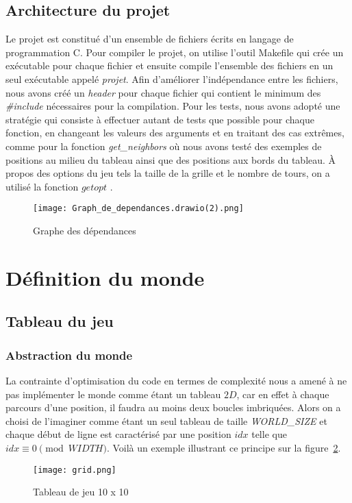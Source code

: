 \documentclass[11pt]{article}
\begin{document}
        \subsection{Architecture du projet}
            Le projet est constitué d'un ensemble de fichiers écrits en langage de programmation C. Pour compiler le projet, on utilise l'outil Makefile qui crée un exécutable pour chaque fichier et ensuite compile l'ensemble des fichiers en un seul exécutable appelé \textit{projet}. Afin d'améliorer l'indépendance entre les fichiers, nous avons créé un \textit{header} pour chaque fichier qui contient le minimum des \textit{\#include} nécessaires pour la compilation. Pour les tests, nous avons adopté une stratégie qui consiste à effectuer autant de tests que possible pour chaque fonction, en changeant les valeurs des arguments et en traitant des cas extrêmes, comme pour la fonction \textit{get\_neighbors} où nous avons testé des exemples de positions au milieu du tableau ainsi que des positions aux bords du tableau. À propos des options du jeu tels la taille de la grille et le nombre de tours, on a utilisé la fonction $getopt$ .
             \begin{figure}[h]
                \centering
                \texttt{[image: Graph\_de\_dependances.drawio(2).png]}
                \caption{Graphe des dépendances }
                \label{figure}
                \end{figure}
    \section{Définition du monde }
        \subsection{Tableau du jeu}
            \subsubsection{Abstraction du monde}
                La contrainte d'optimisation du code en termes de complexité nous a amené à ne pas implémenter le monde comme étant un tableau $2D$, car en effet à chaque parcours d'une position, il faudra au moins deux boucles imbriquées. Alors on a choisi de l'imaginer comme étant un seul tableau de taille \textit{WORLD\_SIZE} et chaque début de ligne est caractérisé par une position $idx$ telle que $idx \equiv 0 \pmod{WIDTH}$. Voilà un exemple illustrant ce principe sur la figure~\ref{figure2}.
                \begin{figure}[h]
                \centering
                \texttt{[image: grid.png]}
                \caption{Tableau de jeu 10 x 10}
                \label{figure2}
                \end{figure}
\end{document}
